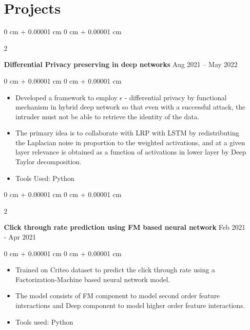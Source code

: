 \documentclass[30pt, a4paper]{article}
\newenvironment{highlights}{
    \begin{itemize}[
        topsep=0.10 cm,
        parsep=0.10 cm,
        partopsep=0pt,
        itemsep=0pt,
        leftmargin=0 cm + 10pt
    ]
}{
    \end{itemize}
} %
\newenvironment{onecolentry}{
    \begin{adjustwidth}{
        0 cm + 0.00001 cm
    }{
        0 cm + 0.00001 cm
    }
}{
    \end{adjustwidth}
} %
\newenvironment{twocolentry}[2][]{
    \onecolentry
    \def\secondColumn{#2}
    \setcolumnwidth{\fill, 4.5 cm}
    \begin{paracol}{2}
}{
    \switchcolumn \raggedleft \secondColumn
    \end{paracol}
    \endonecolentry
} %
\begin{document}
    \section{Projects}
        
        \begin{twocolentry}{
            Aug 2021 – May 2022
        }
            \textbf{Differential Privacy preserving in deep networks}\end{twocolentry}

        \vspace{0.10 cm}
        \begin{onecolentry}
            \begin{highlights}
                \item Developed a framework to employ \begin{math} \epsilon \end{math} - differential privacy by functional mechanism in hybrid deep network so that even with a successful attack, the intruder must not be able to retrieve the identity of the data.
                \item The primary idea is to collaborate with LRP with LSTM by redistributing the Laplacian noise in proportion to the weighted activations, and at a given layer relevance is obtained as a function of activations in lower layer by Deep Taylor decomposition.
                \item Tools Used: Python
            \end{highlights}
        \end{onecolentry}


        \vspace{0.2 cm}

        \begin{twocolentry}{
            Feb 2021 - Apr 2021
        }
            \textbf{Click through rate prediction using FM based neural network}\end{twocolentry}

        \vspace{0.10 cm}
        \begin{onecolentry}
            \begin{highlights}
                \item Trained on Criteo dataset to predict the click through rate using a Factorization-Machine based neural network model.
                \item The model consists of FM component to model second order feature interactions and Deep component to model higher order feature interactions.
                \item Tools used: Python
            \end{highlights}
        \end{onecolentry}
    
\end{document}
